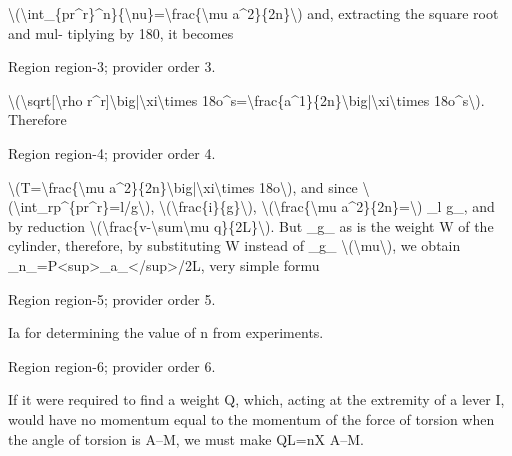 \documentclass[11pt]{article}
\begin{document}
\textbackslash{}(\textbackslash{}int\_\{pr\textasciicircum{}r\}\textasciicircum{}n\}\{\textbackslash{}nu\}=\textbackslash{}frac\{\textbackslash{}mu a\textasciicircum{}2\}\{2n\}\textbackslash{}) and, extracting the square root and mul- tiplying by 180, it becomes
\par

{\scriptsize\color{gray} Region region-3; provider order 3.\par}
\medskip

\textbackslash{}(\textbackslash{}sqrt[\textbackslash{}rho r\textasciicircum{}r]\textbackslash{}big|\textbackslash{}xi\textbackslash{}times 18o\textasciicircum{}s=\textbackslash{}frac\{a\textasciicircum{}1\}\{2n\}\textbackslash{}big|\textbackslash{}xi\textbackslash{}times 18o\textasciicircum{}s\textbackslash{}). Therefore
\par

{\scriptsize\color{gray} Region region-4; provider order 4.\par}
\medskip

\textbackslash{}(T=\textbackslash{}frac\{\textbackslash{}mu a\textasciicircum{}2\}\{2n\}\textbackslash{}big|\textbackslash{}xi\textbackslash{}times 18o\textbackslash{}), and since \textbackslash{}(\textbackslash{}int\_rp\textasciicircum{}\{pr\textasciicircum{}r\}=l/g\textbackslash{}), \textbackslash{}(\textbackslash{}frac\{i\}\{g\}\textbackslash{}), \textbackslash{}(\textbackslash{}frac\{\textbackslash{}mu a\textasciicircum{}2\}\{2n\}=\textbackslash{}) \_l g\_, and by reduction \textbackslash{}(\textbackslash{}frac\{v-\textbackslash{}sum\textbackslash{}mu q\}\{2L\}\textbackslash{}). But \_g\_ as is the weight W of the cylinder, therefore, by substituting W instead of \_g\_ \textbackslash{}(\textbackslash{}mu\textbackslash{}), we obtain \_n\_=P<sup>\_a\_</sup>/2L, very simple formu
\par

{\scriptsize\color{gray} Region region-5; provider order 5.\par}
\medskip

Ia for determining the value of n from experiments.
\par

{\scriptsize\color{gray} Region region-6; provider order 6.\par}
\medskip

If it were required to find a weight Q, which, acting at the extremity of a lever I, would have no momentum equal to the momentum of the force of torsion when the angle of torsion is A--M, we must make QL=nX A--M.
\par
\end{document}
